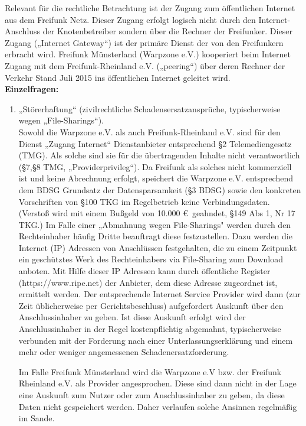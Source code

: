 \documentclass{article}
\begin{document}
Relevant für die rechtliche Betrachtung ist der Zugang zum öffentlichen Internet aus dem Freifunk Netz. Dieser Zugang erfolgt logisch nicht durch den Internet-Anschluss der Knotenbetreiber sondern über die Rechner der Freifunker. Dieser Zugang („Internet Gateway“) ist der primäre Dienst der von den Freifunkern erbracht wird. Freifunk  Münsterland (Warpzone e.V.) kooperiert beim Internet Zugang mit dem Freifunk-Rheinland e.V. („peering“)  über deren Rechner der Verkehr Stand Juli 2015 ins öffentlichen Internet geleitet wird.\bigskip\\

\textbf{Einzelfragen:}

\begin{enumerate}\item  „Störerhaftung“ (zivilrechtliche Schadensersatzansprüche, typischerweise wegen „File-Sharings“).\\
Sowohl die Warpzone e.V. als auch Freifunk-Rheinland e.V. sind für den Dienst „Zugang Internet“ Dienstanbieter entsprechend §2 Telemediengesetz (TMG).  Als solche sind sie für die übertragenden Inhalte nicht verantwortlich (§7,§8 TMG, „Providerprivileg“). Da Freifunk als solches nicht kommerziell ist und keine Abrechnung erfolgt, speichert die Warpzone e.V. entsprechend dem BDSG Grundsatz der Datensparsamkeit (§3 BDSG) sowie den konkreten Vorschriften von §100 TKG im Regelbetrieb keine Verbindungsdaten. (Verstoß wird mit einem Bußgeld von 10.000 \euro\ geahndet, §149 Abs 1, Nr 17 TKG.) Im Falle einer „Abmahnung wegen File-Sharings" werden durch den Rechteinhaber  häufig Dritte beauftragt diese festzustellen. Dazu werden die Internet (IP) Adressen von Anschlüssen festgehalten, die zu einem Zeitpunkt ein geschütztes Werk des Rechteinhabers via File-Sharing zum Download anboten. Mit Hilfe dieser IP Adressen kann durch öffentliche Register (https://www.ripe.net) der Anbieter, dem diese Adresse zugeordnet ist, ermittelt werden. Der entsprechende   Internet Service Provider wird dann (zur Zeit üblicherweise per Gerichtsbeschluss) aufgefordert  Auskunft über den Anschlussinhaber zu geben. Ist diese Auskunft erfolgt wird der Anschlussinhaber in der Regel kostenpflichtig abgemahnt, typischerweise verbunden mit der Forderung nach einer Unterlassungserklärung und einem mehr oder weniger angemessenen Schadenersatzforderung.

Im Falle Freifunk Münsterland wird die Warpzone e.V bzw. der Freifunk Rheinland e.V. als Provider angesprochen. Diese sind dann nicht in der Lage eine Auskunft zum Nutzer oder zum Anschlussinhaber zu geben, da diese Daten nicht gespeichert werden. Daher verlaufen solche Ansinnen regelmäßig im Sande.


\end{enumerate}
\end{document}
